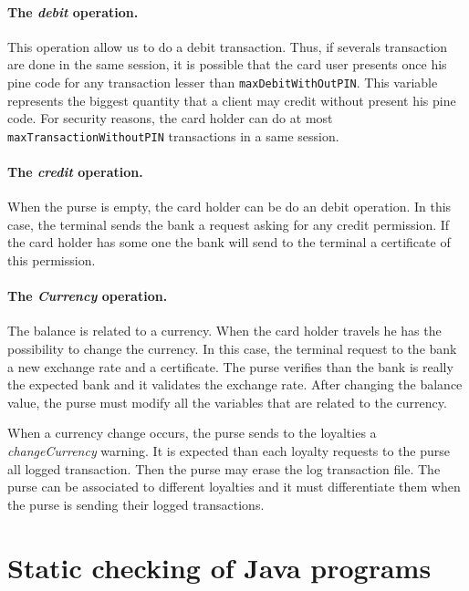 \documentclass[a4paper]{llncs}
\begin{document}
\paragraph{The \textit{debit} operation.}
This operation allow us to do a debit transaction. Thus, if
severals transaction are done in the same session, it is possible that 
the card user presents once his pine code for any transaction lesser than
\texttt{maxDebitWithOutPIN}. This variable represents the biggest
quantity that a client may credit without present his pine code. For
security reasons, the card holder can do at most
\texttt{maxTransactionWithoutPIN} transactions in a same session. 


\paragraph{The \textit{credit} operation.} When the purse is empty, the 
card holder can be do an debit operation. In this case, the terminal
sends the bank a request asking for any credit permission. If the card 
holder has some one the bank will send to the terminal a certificate of 
this permission. 



\paragraph{The \textit{Currency} operation.} The balance is related to a
currency. When the card holder travels he has the possibility to
change the currency. In this case, the terminal request to the bank a
new exchange rate and a certificate. The purse verifies than the bank is 
really the expected bank and it validates the exchange rate. After
changing the balance value, the purse must modify all the variables
that are related to the currency. 

When a currency change occurs, the purse sends to the loyalties a
\textit{changeCurrency} warning. It is expected than each loyalty
requests to the purse all logged transaction.  Then the purse may erase 
the log transaction file. The purse can be associated to different
loyalties and it must differentiate them when the purse is sending
their logged transactions. 






\section{Static checking of Java programs}
\label{SectStatic}
\end{document}
